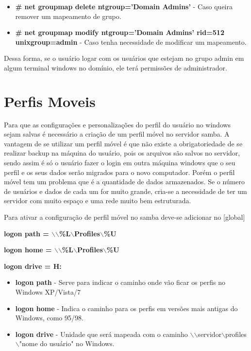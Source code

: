\begin{itemize}
	\item \textbf{\# net groupmap delete ntgroup='Domain Admins'} - Caso queira remover um mapeamento de grupo.
	\item \textbf{\# net groupmap modify ntgroup='Domain Admins' rid=512 unixgroup=admin} - Caso tenha necessidade de modificar um mapeamento.
\end{itemize}

Dessa forma, se o usuário logar com os usuários que estejam no grupo admin em algum terminal windows no domínio, ele terá permissões de administrador.

\section{Perfis Moveis}

Para que as configurações e personalizações do perfil do usuário no windows sejam salvas é necessário a criação de um perfil móvel no servidor samba. 
A vantagem de se utilizar um perfil móvel é que não existe a obrigatoriedade de se realizar backup na máquina do usuário, pois os arquivos são salvos no servidor, sendo assim é só o usuário fazer o login em outra máquina windows que o seu perfil e os seus dados serão migrados para o novo computador. Porém o perfil móvel tem um problema que é a quantidade de dados armazenados. Se o número de usuários e dados de cada um for muito grande, cria-se a necessidade de ter um servidor com muito espaço e uma rede muito bem estruturada. 

Para ativar a configuração de perfil móvel no samba deve-se adicionar no [global] 

\textbf	{logon path = $\backslash$$\backslash$\%L$\backslash$Profiles$\backslash$\%U}

\textbf {logon home = $\backslash$$\backslash$\%L$\backslash$Profiles$\backslash$\%U}

\textbf	{logon drive = H:}

\begin{itemize}
	\item \textbf{logon path} - Serve para indicar o caminho onde vão ficar os perfis no Windows XP/Vista/7 
	\item \textbf{logon home} - Indica o caminho para os perfis em versões mais antigas do Windows, como 95/98.
	\item \textbf{logon drive} - Unidade que será mapeada com o caminho $\backslash$$\backslash$servidor$\backslash$profiles$\backslash$"nome do usuário" no Windows.
\end{itemize}

